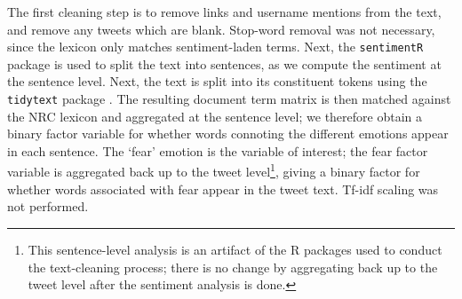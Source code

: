 \documentclass[12pt,a4]{article}
\begin{document}
The first cleaning step is to remove links and username mentions from the text, and remove any tweets which are blank. Stop-word removal was not necessary, since the lexicon only matches sentiment-laden terms. Next, the \texttt{sentimentR} package \parencite{rinkerSentimentr2018} is used to split the text into sentences, as we compute the sentiment at the sentence level. Next, the text is split into its constituent tokens using the \texttt{tidytext} package \parencite{silgeTextMiningTidy2017}. The resulting document term matrix is then matched against the NRC lexicon and aggregated at the sentence level; we therefore obtain a binary factor variable for whether words connoting the different emotions appear in each sentence. The `fear' emotion is the variable of interest; the fear factor variable is aggregated back up to the tweet level\footnote{This sentence-level analysis is an artifact of the R packages used to conduct the text-cleaning process; there is no change by aggregating back up to the tweet level after the sentiment analysis is done.}, giving a binary factor for whether words associated with fear appear in the tweet text.  Tf-idf scaling was not performed.
\end{document}
